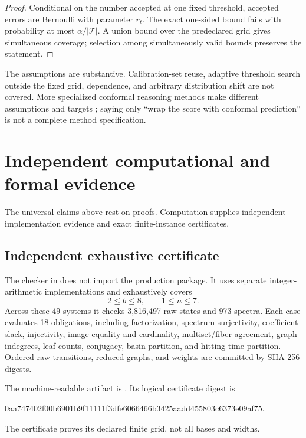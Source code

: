 \documentclass[11pt]{article}
\theoremstyle{definition}
\theoremstyle{remark}
\newcommand{\1}{\mathbf{1}}
\begin{document}
\begin{proof}
Conditional on the number accepted at one fixed threshold, accepted errors
are Bernoulli with parameter $r_t$.  The exact one-sided bound fails with
probability at most $\alpha/|\mathcal{T}|$.  A union bound over the predeclared
grid gives simultaneous coverage; selection among simultaneously valid bounds
preserves the statement.
\end{proof}

The assumptions are substantive.  Calibration-set reuse, adaptive threshold
search outside the fixed grid, dependence, and arbitrary distribution shift
are not covered.  More specialized conformal reasoning methods make different
assumptions and targets \cite{zhou2026orca}; saying only ``wrap the score with
conformal prediction'' is not a complete method specification.

\section{Independent computational and formal evidence}

The universal claims above rest on proofs.  Computation supplies independent
implementation evidence and exact finite-instance certificates.

\subsection{Independent exhaustive certificate}

The checker in  does not import the
production  package.  It uses separate integer-arithmetic
implementations and exhaustively covers
\[
  2\leq b\leq8,
  \qquad 1\leq n\leq7.
\]
Across these 49 systems it checks 3,816,497 raw states and 973 spectra.  Each
case evaluates 18 obligations, including factorization, spectrum
surjectivity, coefficient slack, injectivity, image equality and cardinality,
multiset/fiber agreement, graph indegrees, leaf counts, conjugacy, basin
partition, and hitting-time partition.  Ordered raw transitions, reduced
graphs, and weights are committed by SHA-256 digests.

The machine-readable artifact is
.  Its logical certificate
digest is
\begin{center}
\small\ttfamily
0aa747402f00b6901b9f11111f3dfe6066466b3425aadd455803c6373e09af75.
\end{center}
The certificate proves its declared finite grid, not all bases and widths.
\end{document}
